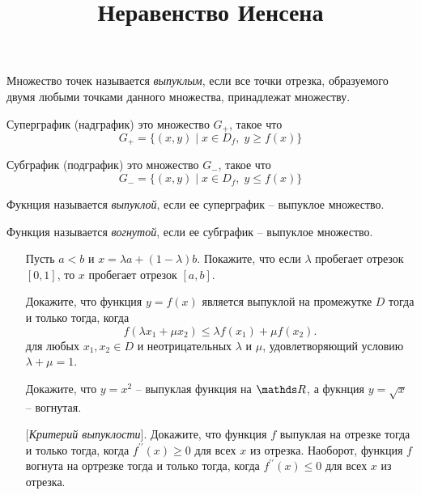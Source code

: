 \documentclass[a4paper,12pt,leqno]{article}
\title{Неравенство Иенсена}
\date{}
\begin{document}
	
	\maketitle


	\newcommand{\z}{\addtocounter{num}{1}%
	\boxed{\arabic{num}} }

	\newcommand{\hw}{\addtocounter{num}{1}%
	\text{ДЗ }\boxed{\arabic{num}} }
    
	\begin{definition}
		Множество точек называется \textit{выпуклым}, если все точки отрезка, образуемого двумя любыми точками данного множества, принадлежат множеству.
	\end{definition}

	\begin{definition}
		Суперграфик (надграфик) это множество $G_+$, такое что
		$$G_+ = \lbrace (x, y) \; | \; x \in D_{f},\; y \geqslant f(x) \rbrace $$
	\end{definition}

	\begin{definition}
		Субграфик (подграфик) это множество $G_-$, такое что
		$$G_- = \lbrace (x, y) \; | \; x \in D_{f},\; y \leqslant f(x) \rbrace $$
	\end{definition}

	\begin{definition}

		\begin{enumerate}
			\item[] 
		\end{enumerate}
		Фукнция называется \textit{выпуклой}, если ее суперграфик -- выпуклое множество.

		Функция называется \textit{вогнутой}, если ее субграфик  -- выпуклое множество.
	\end{definition}

	\begin{enumerate}
		\item[\z]  Пусть $a < b$ и $x = \lambda a + (1-\lambda) b$. Покажите, что если $\lambda$ пробегает отрезок $[0, 1]$, то $x$ пробегает отрезок  $[a, b]$.
		\item[\z] Докажите, что функция $y = f(x)$ является выпуклой на промежутке $D$ тогда и только тогда, когда
				$$f(\lambda x_1 + \mu x_2) \leq \lambda f(x_1) + \mu f(x_2).$$ 
				для любых $x_1, x_2 \in D$ и неотрицательных $\lambda$ и $\mu$, удовлетворяющий условию $\lambda + \mu = 1$.
		\item[\z] Докажите, что $y = x^2$ -- выпуклая функция на $\R$, а фукнция $y = \sqrt{x}$ -- вогнутая.
		\item[\z] [\textit{Критерий выпуклости}]. Докажите, что функция $f$ выпуклая на отрезке тогда и только тогда, когда $f^{\prime\prime}(x) \geqslant 0$ для всех $x$ из отрезка. Наоборот, функция $f$ вогнута на ортрезке тогда и только тогда, когда $f^{\prime\prime}(x) \leqslant 0$ для всех $x$ из отрезка.
	 
	\end{enumerate}
\end{document}
